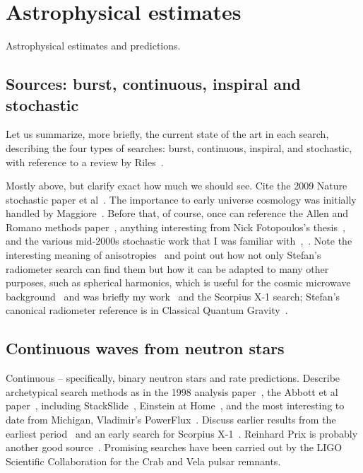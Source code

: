     \section{Astrophysical estimates}
    \label{estimates}

        Astrophysical estimates and predictions.

        \subsection{Sources: burst, continuous, inspiral and stochastic}
        \label{source_types}


            Let us summarize, more briefly, the current state of the art in each search, describing the four types of searches: burst, continuous, inspiral, and stochastic, with reference to a review by Riles~\cite{Riles2013}.

		Mostly above, but clarify exact how much we should see. Cite the 2009 Nature stochastic paper et al~\cite{LIGOStochasticNature2009}. The importance to early universe cosmology was initially handled by Maggiore~\cite{Maggiore2000}. Before that, of course, once can reference the Allen and Romano methods paper~\cite{Allen1999}, anything interesting from Nick Fotopoulos's thesis~\cite{FotopoulosThesis}, and the various mid-2000s stochastic work that I was familiar with~\cite{Abbott2006},~\cite{Abbott2007}. Note the interesting meaning of anisotropies~\cite{Allen1997} and point out how not only Stefan's radiometer search can find them but how it can be adapted to many other purposes, such as spherical harmonics, which is useful for the cosmic microwave background~\cite{Muciaccia1997} and was briefly my work~\cite{MeadorsCaltech2007} and the Scorpius X-1 search; Stefan's canonical radiometer reference is in Classical Quantum Gravity~\cite{Radiometer2006}.

        \subsection{Continuous waves from neutron stars}
        \label{continuous_waves}

            Continuous -- specifically, binary neutron stars and rate predictions. Describe archetypical search methods as in the 1998 analysis paper~\cite{Jaranowski1998}, the Abbott et al paper~\cite{LSCPulsar2006}, including StackSlide~\cite{LSCPulsarS4}, Einstein at Home~\cite{LSCEinsteinHome2009}, and the most interesting to date from Michigan, Vladimir's PowerFlux~\cite{LSCPowerFlux2009}. Discuss earlier results from the earliest period~\cite{Abbott2004} and an early search for Scorpius X-1~\cite{AbbottPulsar2006}. Reinhard Prix is probably another good source~\cite{Prix2006}.
Promising searches have been carried out by the LIGO Scientific Collaboration for the Crab and Vela pulsar remnants.

